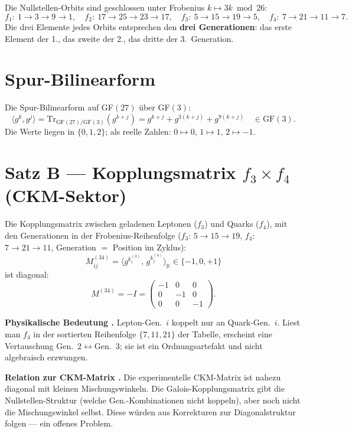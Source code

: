 \begin{theorem}
Die Nullstellen-Orbits sind geschlossen unter Frobenius $k\mapsto3k\bmod26$:
\[
  f_1:\ 1\to3\to9\to1,\quad
  f_2:\ 17\to25\to23\to17,\quad
  f_3:\ 5\to15\to19\to5,\quad
  f_4:\ 7\to21\to11\to7.
\]
Die drei Elemente jedes Orbits entsprechen den \textbf{drei Generationen}:
das erste Element der 1., das zweite der 2., das dritte der 3.~Generation.
\end{theorem}

\section{Spur-Bilinearform}

Die Spur-Bilinearform auf GF$(27)$ über GF$(3)$:
\[
  \langle g^k, g^j \rangle = \mathrm{Tr}_{\mathrm{GF}(27)/\mathrm{GF}(3)}(g^{k+j})
  = g^{k+j} + g^{3(k+j)} + g^{9(k+j)} \quad \in \mathrm{GF}(3).
\]
Die Werte liegen in $\{0, 1, 2\}$; als reelle Zahlen: $0\mapsto0$,
$1\mapsto1$, $2\mapsto-1$.

\section{Satz B --- Kopplungsmatrix $f_3 \times f_4$ (CKM-Sektor)}

\begin{theorem}
Die Kopplungsmatrix zwischen geladenen Leptonen ($f_3$) und Quarks ($f_4$),
mit den Generationen in der Frobenius-Reihenfolge ($f_3$: $5\to15\to19$,
$f_4$: $7\to21\to11$, Generation $=$ Position im Zyklus):
\[
  M_{ij}^{(34)} = \langle g^{k_i^{(3)}},\, g^{k_j^{(4)}} \rangle_{\mathbb{R}}
  \in \{-1,0,+1\}
\]
ist diagonal:
\[
  M^{(34)} = -I = \begin{pmatrix} -1 & 0 & 0 \\ 0 & -1 & 0 \\ 0 & 0 & -1 \end{pmatrix}.
\]
\end{theorem}

\textbf{Physikalische Bedeutung \BM.} Lepton-Gen.~$i$ koppelt nur an
Quark-Gen.~$i$. Liest man $f_4$ in der sortierten Reihenfolge $\{7,11,21\}$
der Tabelle, erscheint eine Vertauschung Gen.~2$\leftrightarrow$Gen.~3;
sie ist ein Ordnungsartefakt und nicht algebraisch erzwungen.

\textbf{Relation zur CKM-Matrix \SM.} Die experimentelle CKM-Matrix
ist nahezu diagonal mit kleinen Mischungswinkeln. Die Galois-Kopplungsmatrix
gibt die Nullstellen-Struktur (welche Gen.-Kombinationen nicht koppeln),
aber noch nicht die Mischungswinkel selbst. Diese würden aus Korrekturen
zur Diagonalstruktur folgen --- ein offenes Problem.

